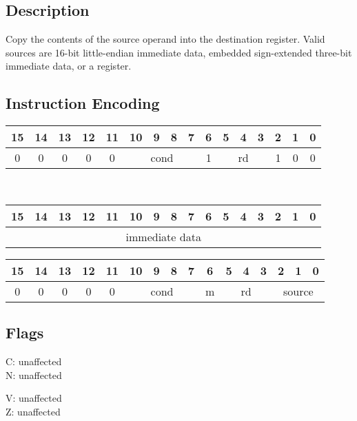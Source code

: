 \documentclass[11pt]{book}
\newcommand*{\encoding}[1]{\noindent
\begin{tabular}{|c|c|c|c|c|c|c|c|c|c|c|c|c|c|c|c|}
\multicolumn{1}{c}{15}&
\multicolumn{1}{c}{14}&
\multicolumn{1}{c}{13}&
\multicolumn{1}{c}{12}&
\multicolumn{1}{c}{11}&
\multicolumn{1}{c}{10}&
\multicolumn{1}{c}{9}&
\multicolumn{1}{c}{8}&
\multicolumn{1}{c}{7}&
\multicolumn{1}{c}{6}&
\multicolumn{1}{c}{5}&
\multicolumn{1}{c}{4}&
\multicolumn{1}{c}{3}&
\multicolumn{1}{c}{2}&
\multicolumn{1}{c}{1}&
\multicolumn{1}{c}{0}\\\hline
#1\\\hline
\end{tabular}}
\begin{document}
\subsection*{Description}
Copy the contents of the source operand into the destination register.
Valid sources are 16-bit little-endian immediate data,
embedded sign-extended three-bit immediate data,
or a register.

\subsection*{Instruction Encoding}
\encoding{0&0&0&0&0%
&\multicolumn{4}{|c|}{cond}%
&1&\multicolumn{3}{|c|}{rd}&1&0&0}\\\null\qquad
\encoding{\multicolumn{16}{|c|}{immediate data}}

\vspace{2\baselineskip}
\encoding{0&0&0&0&0%
&\multicolumn{4}{|c|}{cond}%
&m&\multicolumn{3}{|c|}{rd}&\multicolumn{3}{|c|}{source}}

\subsection*{Flags}
\begin{multicols}{2}\noindent
  C: unaffected\\
  N: unaffected

  \columnbreak\noindent
  V: unaffected\\
  Z: unaffected
\end{multicols}
\end{document}

